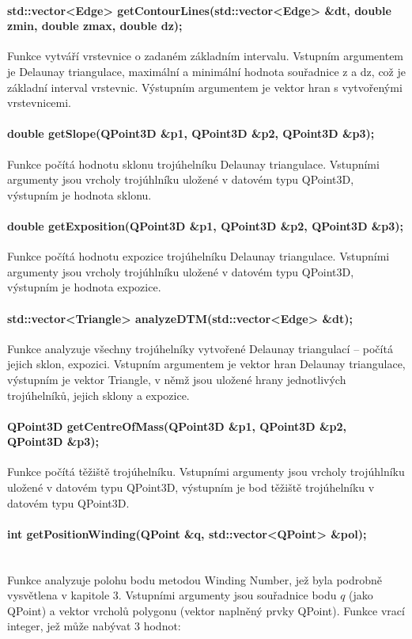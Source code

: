 \documentclass[11pt]{article}
\begin{document}
\paragraph {std::vector<Edge> getContourLines(std::vector<Edge> \&dt, double zmin, double zmax, double dz);}
Funkce vytváří vrstevnice o zadaném základním intervalu. Vstupním argumentem je De\-launay triangulace, maximální a minimální hodnota souřadnice z a dz, což je základní interval vrstevnic. Výstupním argumentem je vektor hran s vytvořenými vrstevnicemi.

\paragraph {double getSlope(QPoint3D \&p1, QPoint3D \&p2, QPoint3D \&p3);}
Funkce počítá hodnotu sklonu trojúhelníku Delaunay triangulace. Vstupními argumenty jsou vrcholy trojúhlníku uložené v datovém typu QPoint3D, výstupním je hodnota sklonu.

\paragraph {double getExposition(QPoint3D \&p1, QPoint3D \&p2, QPoint3D \&p3);}
Funkce počítá hodnotu expozice trojúhelníku Delaunay triangulace. Vstupními argumenty jsou vrcholy trojúhlníku uložené v datovém typu QPoint3D, výstupním je hodnota expozice.

\paragraph {std::vector<Triangle> analyzeDTM(std::vector<Edge> \&dt);}
Funkce analyzuje všechny trojúhelníky vytvořené Delaunay triangulací – počítá jejich sklon, expozici. Vstupním argumentem je vektor hran Delaunay triangulace, výstupním je vektor Triangle, v němž jsou uložené hrany jednotlivých trojúhelníků, jejich sklony a expozice.

\paragraph {QPoint3D getCentreOfMass(QPoint3D \&p1, QPoint3D \&p2, QPoint3D \&p3);}
Funkce počítá těžiště trojúhelníku. Vstupními argumenty jsou vrcholy trojúhlníku uložené v datovém typu QPoint3D, výstupním je bod těžiště trojúhelníku v datovém typu QPoint3D. 

\paragraph{int getPositionWinding(QPoint \&q, std::vector<QPoint> \&pol);}\mbox{}\\
Funkce analyzuje polohu bodu metodou Winding Number, jež byla podrobně vysvětlena v kapitole 3.  Vstupními argumenty jsou souřadnice bodu $q$ (jako QPoint) a vektor vrcholů polygonu (vektor naplněný prvky QPoint). Funkce vrací integer, jež může nabývat 3 hodnot:
\end{document}
